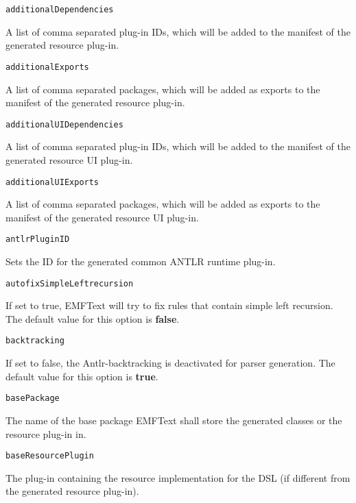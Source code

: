 \noindent\texttt{additionalDependencies}
\begin{myindentpar}{1cm}
A list of comma separated plug-in IDs, which will be added to the manifest of the generated resource plug-in.
\end{myindentpar}

\noindent\texttt{additionalExports}
\begin{myindentpar}{1cm}
A list of comma separated packages, which will be added as exports to the manifest of the generated resource plug-in.
\end{myindentpar}

\noindent\texttt{additionalUIDependencies}
\begin{myindentpar}{1cm}
A list of comma separated plug-in IDs, which will be added to the manifest of the generated resource UI plug-in.
\end{myindentpar}

\noindent\texttt{additionalUIExports}
\begin{myindentpar}{1cm}
A list of comma separated packages, which will be added as exports to the manifest of the generated resource UI plug-in.
\end{myindentpar}

\noindent\texttt{antlrPluginID}
\begin{myindentpar}{1cm}
Sets the ID for the generated common ANTLR runtime plug-in.
\end{myindentpar}

\noindent\texttt{autofixSimpleLeftrecursion}
\begin{myindentpar}{1cm}
If set to true, EMFText will try to fix rules that contain simple left recursion. The default value for this option is \textbf{false}.
\end{myindentpar}

\noindent\texttt{backtracking}
\begin{myindentpar}{1cm}
If set to false, the Antlr-backtracking is deactivated for parser generation. The default value for this option is \textbf{true}.
\end{myindentpar}

\noindent\texttt{basePackage}
\begin{myindentpar}{1cm}
The name of the base package EMFText shall store the generated classes or the resource plug-in in.
\end{myindentpar}

\noindent\texttt{baseResourcePlugin}
\begin{myindentpar}{1cm}
The plug-in containing the resource implementation for the DSL (if different from the generated resource plug-in).
\end{myindentpar}

